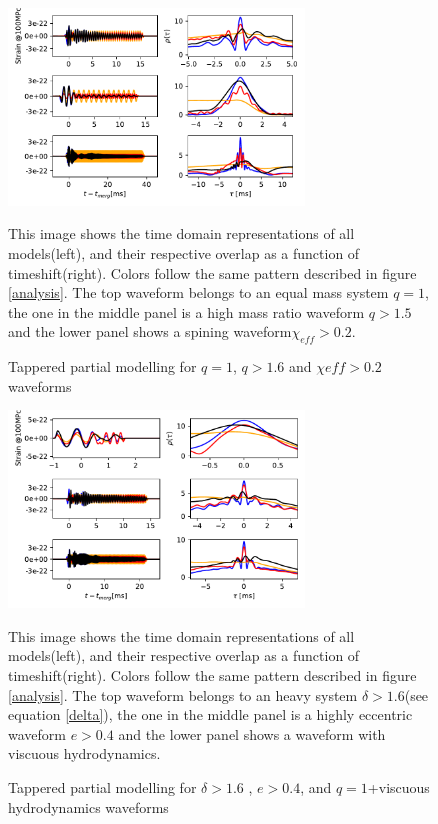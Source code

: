 \begin{figure}[hbt!]
\begin{center}
\includegraphics[width=0.7\textwidth, angle=0]{images/Data_analysis/results/phi-A3.pdf}
\caption{Tappered partial modelling for $q=1$, $q>1.6$ and $\chi{eff}>0.2$ waveforms}
\end{center}
This image shows the time domain representations of all models(left), and their respective overlap as a function of timeshift(right). Colors follow the same pattern described in figure \ref{analysis}. The top waveform belongs to an equal mass system $q=1$, the one in the middle panel is a high mass ratio waveform $q>1.5$ and the lower panel shows a spining waveform$\chi_{eff}>0.2$.
\end{figure}

\begin{figure}[hbt!]
\begin{center}
\includegraphics[width=0.7\textwidth, angle=0]{images/Data_analysis/results/phi-A4.pdf}
\caption{Tappered partial modelling for $\delta>1.6$ , $e>0.4$, and $q=1$+viscuous hydrodynamics waveforms}
\end{center}
This image shows the time domain representations of all models(left), and their respective overlap as a function of timeshift(right). Colors follow the same pattern described in figure \ref{analysis}. The top waveform belongs to an heavy system $\delta>1.6$(see equation \ref{delta}), the one in the middle panel is a highly eccentric waveform $e>0.4$ and the lower panel shows a waveform with viscuous hydrodynamics.
\end{figure}
\FloatBarrier

